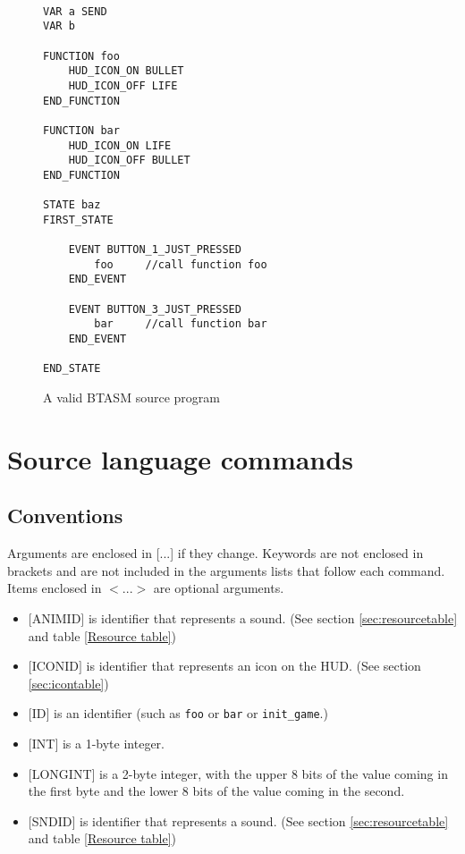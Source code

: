\documentclass[12pt,a4paper]{scrbook}
\begin{document}
\begin{figure}[h]
\begin{lstlisting}

VAR a SEND
VAR b 

FUNCTION foo
	HUD_ICON_ON BULLET
	HUD_ICON_OFF LIFE
END_FUNCTION

FUNCTION bar
	HUD_ICON_ON LIFE
	HUD_ICON_OFF BULLET
END_FUNCTION
	
STATE baz
FIRST_STATE

	EVENT BUTTON_1_JUST_PRESSED
		foo		//call function foo
	END_EVENT

	EVENT BUTTON_3_JUST_PRESSED
		bar		//call function bar
	END_EVENT

END_STATE
\end{lstlisting}
\caption{A valid BTASM source program} 
\end{figure}
\newpage

\section{Source language commands}

\subsection{Conventions}
Arguments are enclosed in [...] if they change.  Keywords are not enclosed in brackets and are not
included in the arguments lists that follow each command.
Items enclosed in $<$...$>$ are optional arguments.

\begin{itemize}
\item $[$ANIMID$]$ is identifier that represents a sound. (See section \ref{sec:resourcetable} and 
		table \ref{Resource table})
\item $[$ICONID$]$ is identifier that represents an icon on the HUD. 
		(See section \ref{sec:icontable})
\item $[$ID$]$ is an identifier (such as \texttt{foo} or \texttt{bar} or \texttt{init\_game}.)
\item $[$INT$]$ is a 1-byte integer.  
\item $[$LONGINT$]$ is a 2-byte integer, with the upper 8 bits of the value coming in the first byte 
		and the lower 8 bits of the value coming in the second.
\item $[$SNDID$]$ is identifier that represents a sound. (See section \ref{sec:resourcetable} and 
		table \ref{Resource table})

\end{itemize}
\end{document}
